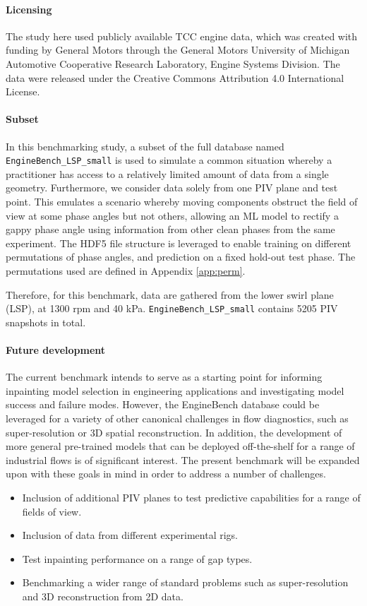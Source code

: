 \documentclass{article}
\begin{document}
\paragraph{Licensing}
The study here used publicly available TCC engine data, which was created with funding by General Motors through the General Motors University of Michigan Automotive Cooperative Research Laboratory, Engine Systems Division. The data were released under the Creative Commons Attribution 4.0 International License.

\paragraph{Subset}
In this benchmarking study, a subset of the full database named \texttt{EngineBench\_LSP\_small} is used to simulate a common situation whereby a practitioner has access to a relatively limited amount of data from a single geometry. Furthermore, we consider data solely from one PIV plane and test point. This emulates a scenario whereby moving components obstruct the field of view at some phase angles but not others, allowing an ML model to rectify a gappy phase angle using information from other clean phases from the same experiment. The HDF5 file structure is leveraged to enable training on different permutations of phase angles, and prediction on a fixed hold-out test phase. The permutations used are defined in Appendix \ref{app:perm}. 

Therefore, for this benchmark, data are gathered from the lower swirl plane (LSP), at 1300 rpm and 40 kPa. \texttt{EngineBench\_LSP\_small} contains 5205 PIV snapshots in total. 

\paragraph{Future development}
The current benchmark intends to serve as a starting point for informing inpainting model selection in engineering applications and investigating model success and failure modes. However, the EngineBench database could be leveraged for a variety of other canonical challenges in flow diagnostics, such as super-resolution or 3D spatial reconstruction. In addition, the development of more general pre-trained models that can be deployed off-the-shelf for a range of industrial flows is of significant interest. The present benchmark will be expanded upon with these goals in mind in order to address a number of challenges. 
\begin{itemize}
    \item Inclusion of additional PIV planes to test predictive capabilities for a range of fields of view.
    \item Inclusion of data from different experimental rigs. 
    \item Test inpainting performance on a range of gap types.
    \item Benchmarking a wider range of standard problems such as super-resolution and 3D reconstruction from 2D data.
\end{itemize}
\end{document}
